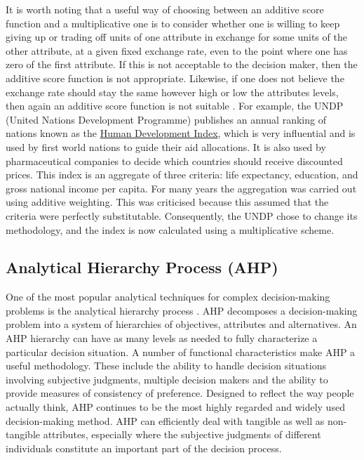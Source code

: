 It is worth noting that a useful way of choosing
between an additive score function and a multiplicative one is to consider
whether one is willing to keep giving up or trading off units of one attribute
in exchange for some units of the other attribute, at
a given fixed exchange rate, even to the point where
one has zero of the first attribute. 
If this is not acceptable to the decision maker, then the additive score
function is not appropriate. Likewise, if one does not
believe the exchange rate should stay the same however high or low the attributes levels, then again an additive score function is not suitable \cite{AddorMultiply}.
For example, the UNDP (United Nations Development Programme)
publishes an annual ranking of nations known as the
\href{http://hdr.undp.org}{Human Development Index},
which is very influential and is used by first world
nations to guide their aid allocations.
It is also used by pharmaceutical companies to decide which countries should receive discounted prices.
This index is an aggregate of three criteria: life expectancy, education, and gross national income per capita.
For many years the aggregation was carried out using additive weighting.
This was criticised because this assumed that the criteria were perfectly substitutable. Consequently, the UNDP chose to
change its methodology, and the index
is now calculated using a multiplicative scheme.

\subsection{Analytical Hierarchy Process (AHP)}
One of the most popular analytical techniques for
complex decision-making problems is the analytical hierarchy process \cite{MCDM}.
AHP decomposes a decision-making problem into a system of hierarchies of objectives, attributes and alternatives. An AHP hierarchy can have as many levels as needed to fully characterize a particular decision situation. A number of functional characteristics make AHP a useful methodology. These include the ability to handle decision situations involving subjective judgments, multiple decision makers and the ability to provide measures of consistency of preference. Designed to reflect the way people actually think, AHP continues to be the most highly regarded and widely used decision-making method. AHP can efficiently deal with tangible as well as non-tangible attributes, especially where the subjective judgments of different individuals constitute an important part of the decision process.

